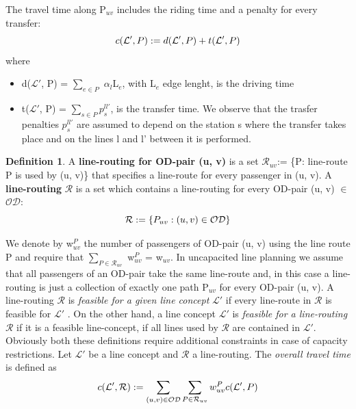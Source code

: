 \documentclass[
  twoside,
  11pt, a4paper,
  footinclude=true,
  headinclude=true,
  cleardoublepage=empty
]{book}
\theoremstyle{definition}
\newtheorem{definition}[theorem]{Definition}
\begin{document}
The travel time along P$_{uv}$ includes the riding time and a penalty for every transfer:
\begin{equation} \notag
c(\mathcal{L'}, P) := d(\mathcal{L'}, P) + t(\mathcal{L'}, P)
\end{equation}
where
\begin{itemize}
\item d($\mathcal{L'}$, P) = $\sum_{e \in P}$ $\alpha_l$L$_e$, with L$_e$ edge lenght, is the driving time
\item t($\mathcal{L'}$, P) =  $\sum_{s \in P} p^{ll'}_s$, is the transfer time. We observe that the trasfer penalties $p^{ll'}_s$ are assumed to depend on the station s where the transfer takes place and on the lines l and l' between it is performed.
\end{itemize}
\begin{definition} A \textbf{line-routing for OD-pair (u, v)} is a set $\mathcal{R}_{uv}$:= \{P: line-route P is used by (u, v)\} that specifies a line-route for every passenger in (u, v). \newline
A \textbf{line-routing} $\mathcal{R}$ is a set which contains a line-routing for every OD-pair (u, v) $\in$ $\mathcal{OD}$:
\begin{equation} \notag
\mathcal{R} := \{P_{uv} : (u, v) \in \mathcal{OD}\}
\end{equation}
\end{definition}
We denote by w$^P_{uv}$ the number of passengers of OD-pair (u, v) using the line route P and require that $\sum_{P \in \mathcal{R}_{uv}}$ w$^P_{uv}$ = w$_{uv}$. In uncapacited line planning we assume that all passengers of an OD-pair take the same line-route and, in this case a line-routing is just a collection of exactly one path P$_{uv}$ for every OD-pair (u, v). \newline
A line-routing $\mathcal{R}$ is \emph{feasible for a given line concept} $\mathcal{L'}$ if every line-route in $\mathcal{R}$ is feasible for $\mathcal{L'}$ . \newline
On the other hand, a line concept $\mathcal{L'}$ is \emph{feasible for a line-routing} $\mathcal{R}$ if it is a feasible line-concept, if all lines used by $\mathcal{R}$ are contained in $\mathcal{L'}$. \newline
Obviously both these definitions require additional constraints in case of capacity restrictions. \newline
Let $\mathcal{L'}$ be a line concept and $\mathcal{R}$ a line-routing. The \emph{overall travel time} is defined as
\begin{equation} \notag
c(\mathcal{L'}, \mathcal{R}) := \sum_{(u, v) \in \mathcal{OD}} \sum_{P \in \mathcal{R}_{uv}} w^P_{uv}c(\mathcal{L'}, P)
\end{equation} 
\end{document}
